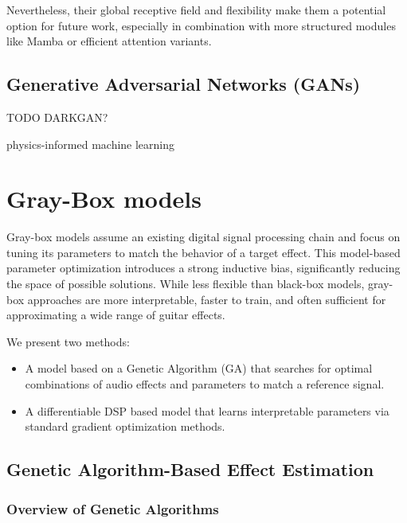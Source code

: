 \documentclass[masterthesis]{fer}
\begin{document}
Nevertheless, their global receptive field and flexibility make them a potential option for future work, especially in combination with more structured modules like Mamba or efficient attention variants.



\section{Generative Adversarial Networks (GANs)}

 TODO
DARKGAN?

physics-informed machine learning

\chapter{Gray-Box models}
\label{sec:graybox_models}

Gray-box models assume an existing digital signal processing chain and focus on tuning its parameters to match the behavior of a target effect. This model-based parameter optimization introduces a strong inductive bias, significantly reducing the space of possible solutions. While less flexible than black-box models, gray-box approaches are more interpretable, faster to train, and often sufficient for approximating a wide range of guitar effects.

We present two methods:
\begin{itemize}
    \item A model based on a Genetic Algorithm (GA) that searches for optimal combinations of audio effects and parameters to match a reference signal.
    \item A differentiable DSP based model that learns interpretable parameters via standard gradient optimization methods.
\end{itemize}

\section{Genetic Algorithm-Based Effect Estimation}
\label{sec:ga_model}

\subsection{Overview of Genetic Algorithms}
\end{document}
